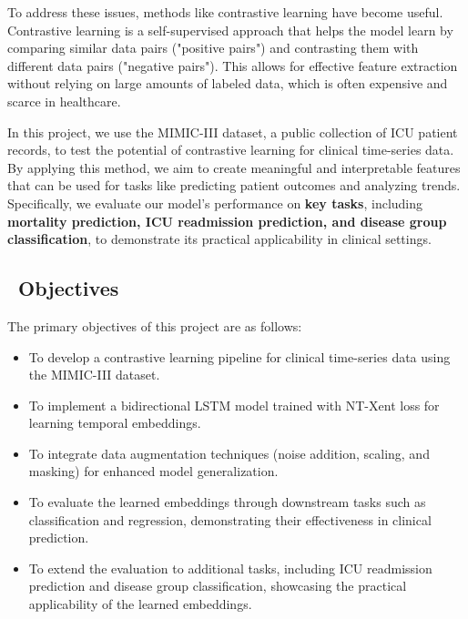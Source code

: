 \documentclass[twocolumn]{article}
\begin{document}
    To address these issues, methods like contrastive learning have become useful.
    Contrastive learning is a self-supervised approach that helps the model
    learn by comparing similar data pairs ("positive pairs") and contrasting
    them with different data pairs ("negative pairs"). This allows for effective
    feature extraction without relying on large amounts of labeled data, which
    is often expensive and scarce in healthcare.

    In this project, we use the MIMIC-III dataset, a public collection of ICU
    patient records, to test the potential of contrastive learning for clinical time-series
    data. By applying this method, we aim to create meaningful and interpretable
    features that can be used for tasks like predicting patient outcomes and analyzing
    trends. Specifically, we evaluate our model's performance on \textbf{key
    tasks}, including \textbf{mortality prediction, ICU readmission prediction,
    and disease group classification}, to demonstrate its practical applicability
    in clinical settings.

    \subsection{\ Objectives}
    The primary objectives of this project are as follows:
    \begin{itemize}
        \item To develop a contrastive learning pipeline for clinical time-series
            data using the MIMIC-III dataset.

        \item To implement a bidirectional LSTM model trained with NT-Xent loss for
            learning temporal embeddings.

        \item To integrate data augmentation techniques (noise addition, scaling,
            and masking) for enhanced model generalization.

        \item To evaluate the learned embeddings through downstream tasks such as
            classification and regression, demonstrating their effectiveness in
            clinical prediction.

        \item To extend the evaluation to additional tasks, including ICU
            readmission prediction and disease group classification, showcasing the
            practical applicability of the learned embeddings.
    \end{itemize}
\end{document}
